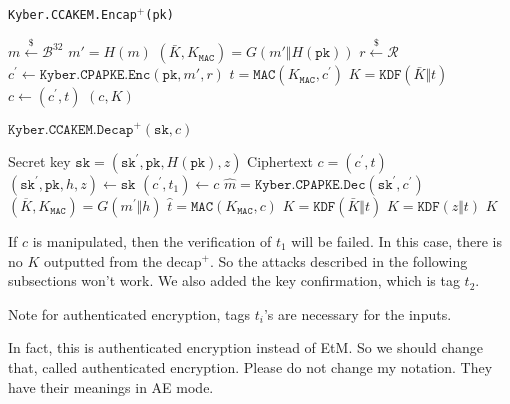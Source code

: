 \documentclass[floatrow,journal=tches,submission]{iacrtrans}
\newcommand{\mac}{\texttt{MAC}}
\newcommand{\pk}{\texttt{pk}}
\newcommand{\sk}{\texttt{sk}}
\newcommand{\leftsample}{\stackrel{\$}{\leftarrow}}
\begin{document}
\begin{algorithm}[H]
    \caption{\texttt{Kyber.CCAKEM.Encap$^+$(\pk)}}\label{alg:kyber-ae-encap}
    \begin{algorithmic}[1]
        \State $m \leftsample \mathcal{B}^{32}$
        \State $m'= H(m)$
        \State $(\bar{K}, K_\mac) = G(m' \Vert H(\pk))$
        \State $r \leftsample \mathcal{R}$
        \State $c^\prime  \leftarrow \texttt{Kyber.CPAPKE.Enc}(\pk, m', r)$
            \State $t=\mac(K_\mac, c^\prime)$
        \State $K = \texttt{KDF}(\bar{K} \Vert t)$
        \State $c \leftarrow (c^\prime, t)$
        \State \Return $(c, K)$
    \end{algorithmic}
\end{algorithm}

\begin{algorithm}[H]
    \caption{$\texttt{Kyber.CCAKEM.Decap}^+ (\sk, c)$}\label{alg:kyber-ae-decap}
    \begin{algorithmic}[1]
        \Require Secret key $\sk = (\sk^\prime, \pk, H(\pk), z)$
        \Require Ciphertext $c = (c^\prime, t)$
        \State $(\sk^\prime, \pk, h, z) \leftarrow \sk$
        \State $(c^\prime, t_1) \leftarrow c$
        \State $\hat{m} = \texttt{Kyber.CPAPKE.Dec}(\sk^\prime, c^\prime)$ 
        \State $(\overline{K}, K_\mac) =   G(m^\prime \Vert h)$
        \State $\hat{t}=\mac(K_\mac, c)$
            \State $K  = \texttt{KDF}(\bar{K} \Vert t)$ 
         \Else 
            \State $K  = \texttt{KDF}(z \Vert t)$ 
        \EndIf
            \State \Return $K$
    \end{algorithmic}
\end{algorithm}

\begin{remark} If $c$ is manipulated, then the verification of  $t_1$  will be failed.  In this case, there is no $K$ outputted from the decap$^+$.  So the attacks described in the following subsections won't work.  We also added the key confirmation, which is tag $t_2$. 
\end{remark}


{\color{blue} Note for authenticated encryption, tags $t_i$'s are necessary for the inputs. 

In fact, this is authenticated encryption instead of EtM. So we should change that, called authenticated encryption. 
Please do not change my notation. They have their meanings in AE mode.}
\end{document}
